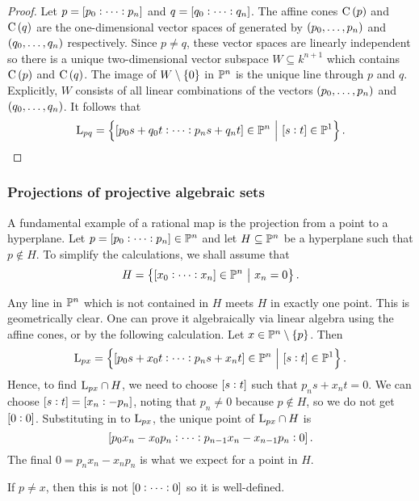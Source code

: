 \begin{proof}
Let $ p = \sbr{p_0 : \dots : p_n} $ and $ q = \sbr{q_0 : \dots : q_n} $. The affine cones $ \C\br{p} $ and $ \C\br{q} $ are the one-dimensional vector spaces of generated by $ \br{p_0, \dots, p_n} $ and $ \br{q_0, \dots, q_n} $ respectively. Since $ p \ne q $, these vector spaces are linearly independent so there is a unique two-dimensional vector subspace $ W \subseteq k^{n + 1} $ which contains $ \C\br{p} $ and $ \C\br{q} $. The image of $ W \setminus \cbr{0} $ in $ \mathbb{P}^n $ is the unique line through $ p $ and $ q $. Explicitly, $ W $ consists of all linear combinations of the vectors $ \br{p_0, \dots, p_n} $ and $ \br{q_0, \dots, q_n} $. It follows that
$$ \L_{pq} = \cbr{\sbr{p_0s + q_0t : \dots : p_ns + q_nt} \in \PP^n \st \sbr{s : t} \in \PP^1}. $$
\end{proof}

\subsubsection{Projections of projective algebraic sets}

A fundamental example of a rational map is the projection from a point to a hyperplane. Let $ p = \sbr{p_0 : \dots : p_n} \in \PP^n $ and let $ H \subseteq \mathbb{P}^n $ be a hyperplane such that $ p \notin H $. To simplify the calculations, we shall assume that
$$ H = \cbr{\sbr{x_0 : \dots : x_n} \in \PP^n \st x_n = 0}. $$

\pagebreak

Any line in $ \mathbb{P}^n $ which is not contained in $ H $ meets $ H $ in exactly one point. This is geometrically clear. One can prove it algebraically via linear algebra using the affine cones, or by the following calculation. Let $ x \in \PP^n \setminus \cbr{p} $. Then
$$ \L_{px} = \cbr{\sbr{p_0s + x_0t : \dots : p_ns + x_nt} \in \PP^n \st \sbr{s : t} \in \PP^1}. $$
Hence, to find $ \mathrm{L}_{px} \cap H $, we need to choose $ \sbr{s : t} $ such that $ p_ns + x_nt = 0 $. We can choose $ \sbr{s : t} = \sbr{x_n : -p_n} $, noting that $ p_n \ne 0 $ because $ p \notin H $, so we do not get $ \sbr{0 : 0} $. Substituting in to $ \mathrm{L}_{px} $, the unique point of $ \mathrm{L}_{px} \cap H $ is
$$ \sbr{p_0x_n - x_0p_n : \dots : p_{n - 1}x_n - x_{n - 1}p_n : 0}. $$
The final $ 0 = p_nx_n - x_np_n $ is what we expect for a point in $ H $.

\begin{note*}
If $ p \ne x $, then this is not $ \sbr{0 : \dots : 0} $ so it is well-defined.
\end{note*}

